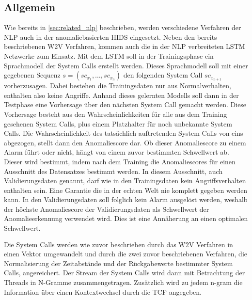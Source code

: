         \subsection{Allgemein}\label{sec:Allgemein}
            Wie bereits in \autoref{sec:related_nlp} beschrieben, werden verschiedene Verfahren der \ac{NLP} auch in der anomaliebasierten \ac{HIDS} eingesetzt.
            Neben den bereits beschriebenen \ac{W2V} Verfahren, kommen auch die in der \ac{NLP} verbreiteten \ac{LSTM} Netzwerke zum Einsatz.
            Mit dem \ac{LSTM} soll in der Trainingsphase ein Sprachmodell der System Calls erstellt werden.
            Dieses Sprachmodell soll mit einer gegebenen Sequenz $s = (sc_{x_1},\dots,sc_{x_n})$ den folgenden System Call $sc_{x_{n+1}}$ vorherzusagen. 
            Dabei bestehen die Trainingsdaten nur aus Normalverhalten, enthalten also keine Angriffe.
            Anhand dieses gelernten Modells soll dann in der Testphase eine Vorhersage über den nächsten System Call gemacht werden.
            Diese Vorhersage besteht aus den Wahrscheinlichkeiten für alle aus dem Training gesehenen System Calls, plus einem Platzhalter für noch unbekannte System Calls.
            Die Wahrscheinlichkeit des tatsächlich auftretenden System Calls von eins abgezogen, stellt dann den Anomaliescore dar.
            Ob dieser Anomaliescore zu einem Alarm führt oder nicht, hängt von einem zuvor bestimmten Schwellwert ab.
            Dieser wird bestimmt, indem nach dem Training die Anomaliescores für einen Ausschnitt des Datensatzes bestimmt werden.
            In diesem Ausschnitt, auch Validierungsdaten genannt, darf wie in den Trainingsdaten kein Angriffsverhalten enthalten sein.
            Eine Garantie die in der echten Welt nie komplett gegeben werden kann.
            In den Validierungsdaten soll folglich kein Alarm ausgelöst werden, weshalb der höchste Anomaliescore der Validierungsdaten als Schwellwert der Anomalieerkennung verwendet wird.
            Dies ist eine Annäherung an einen optimalen Schwellwert.

            Die System Calls werden wie zuvor beschrieben durch das \ac{W2V} Verfahren in einen Vektor umgewandelt und durch die zwei zuvor beschriebenen Verfahren, die Normalisierung der Zeitabstände und der Rückgabewerte bestimmter System Calls, angereichert.
            Der Stream der System Calls wird dann mit Betrachtung der Threads in N-Gramme zusammengetragen.
            Zusätzlich wird zu jedem n-gram die Information über einen Kontextwechsel durch die \ac{TCF} angegeben.


